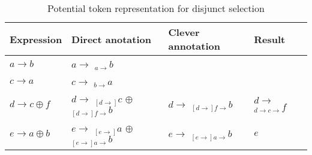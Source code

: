\documentclass[11pt]{article}
\begin{document}
\begin{table}[!ht]\centering
\begin{tabular}{|l|l|l|l|}
\hline
\textbf{Expression} & \textbf{Direct anotation}                                                    & \textbf{Clever annotation} & \textbf{Result} \\
\hline
$a \rightarrow b$   & $a \rightarrow $ $ _{a \rightarrow}b$                                        & & \\
$c \rightarrow a$   & $c \rightarrow $ $ _{b \rightarrow}a$                                        & & \\
$d \rightarrow c \oplus f$ & $d \rightarrow $ $ _{[d \rightarrow]}c$ $\oplus$ $_{[d \rightarrow] f \rightarrow}b$ & $d \rightarrow $ $_{[d \rightarrow] f \rightarrow}b$ & $d \rightarrow $ $_{d \rightarrow c \rightarrow}f$\\
$e \rightarrow a \oplus b$ & $e \rightarrow $ $ _{[e \rightarrow]}a$ $\oplus$ $_{[e \rightarrow] a \rightarrow}b$ & $e \rightarrow $ $_{[e \rightarrow] a \rightarrow}b$ & $e$ \\
\hline
\end{tabular}
\caption{Potential token representation for disjunct selection}
\end{table}
\end{document}
